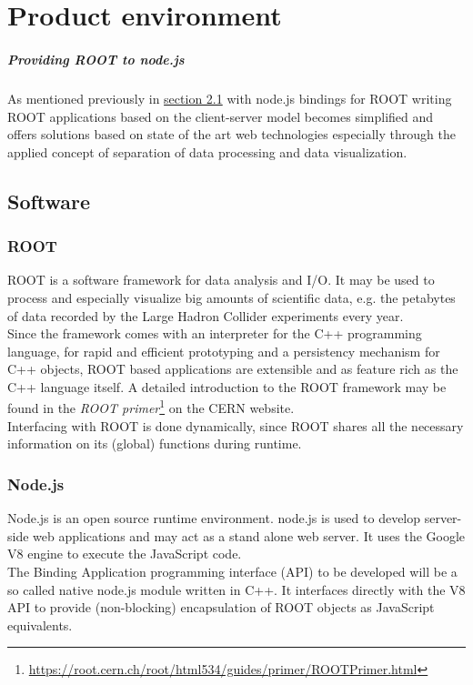 \chapter{Product environment}

\paragraph{Providing ROOT to node.js}
As mentioned previously in \hyperlink{section.2.1}{section 2.1} with node.js bindings for ROOT writing ROOT applications based on the client-server model becomes simplified and offers solutions based on state of the art web technologies especially through the applied concept of separation of data processing and data visualization.

\section{Software}
\subsection{ROOT}
ROOT is a software framework for data analysis and I/O. It may be used to process and especially visualize big amounts of scientific data, e.g. the petabytes of data recorded by the Large Hadron Collider experiments every year.\\
Since the framework comes with an interpreter for the C++ programming language, for rapid and efficient prototyping and a persistency mechanism for C++ objects, ROOT based applications are  extensible and as feature rich as the C++ language itself.
A detailed introduction to the ROOT framework may be found in the \textit{ROOT  primer}\footnote[1]{\url{https://root.cern.ch/root/html534/guides/primer/ROOTPrimer.html}}
on the CERN website.\\
Interfacing with ROOT is done dynamically, since ROOT shares all the necessary information on its (global) functions during runtime.

\subsection{Node.js}
Node.js is an open source runtime environment. node.js is used to develop server-side web applications and may act as a 
stand alone web server. It uses the Google V8 engine to execute the JavaScript code. \\
The Binding Application programming interface (API) to be developed will be a so called native node.js module written in C++. It interfaces directly with the V8 API to provide (non-blocking) encapsulation of ROOT objects as JavaScript equivalents.

